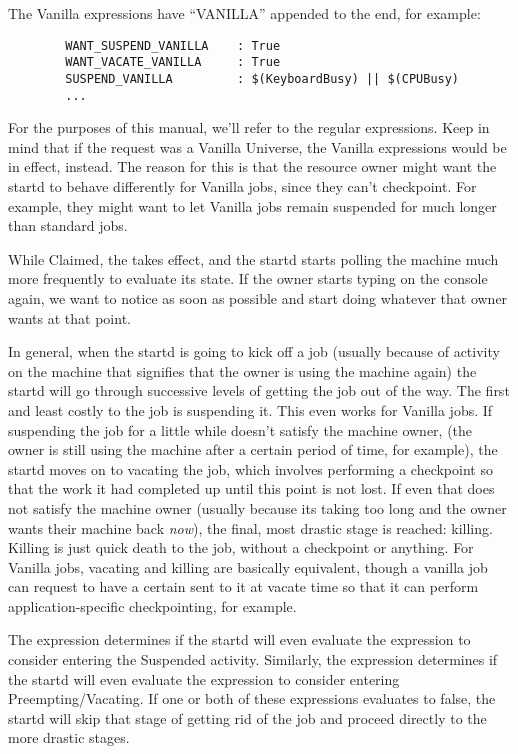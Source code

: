 The Vanilla expressions have ``VANILLA'' appended to the end, for
example:

\begin{verbatim}
        WANT_SUSPEND_VANILLA    : True
        WANT_VACATE_VANILLA     : True
        SUSPEND_VANILLA         : $(KeyboardBusy) || $(CPUBusy)
        ...
\end{verbatim}

For the purposes of this manual, we'll refer to the regular
expressions.  Keep in mind that if the request was a Vanilla Universe,
the Vanilla expressions would be in effect, instead.  The reason for
this is that the resource owner might want the startd to behave
differently for Vanilla jobs, since they can't checkpoint.  For
example, they might want to let Vanilla jobs remain suspended for much
longer than standard jobs.

While Claimed, the  takes effect, and the
startd starts polling the machine much more frequently to evaluate its
state.  If the owner starts typing on the console again, we want to
notice as soon as possible and start doing whatever that owner wants
at that point.  

In general, when the startd is going to kick off a job (usually
because of activity on the machine that signifies that the owner is
using the machine again) the startd will go through successive levels
of getting the job out of the way.  The first and least costly to the
job is suspending it.  This even works for Vanilla jobs.  If
suspending the job for a little while doesn't satisfy the machine
owner, (the owner is still using the machine after a certain period of
time, for example), the startd moves on to vacating the job, which
involves performing a checkpoint so that the work it had completed up
until this point is not lost.  If even that does not satisfy the
machine owner (usually because its taking too long and the owner wants
their machine back \emph{now}), the final, most drastic stage is
reached: killing.  Killing is just quick death to the job, without a
checkpoint or anything.  For Vanilla jobs, vacating and killing are
basically equivalent, though a vanilla job can request to have a
certain  sent to it at vacate time so that it
can perform application-specific checkpointing, for example.

The  expression determines if the startd will even
evaluate the  expression to consider entering the
Suspended activity.  Similarly, the  expression
determines if the startd will even evaluate the 
expression to consider entering Preempting/Vacating.  If one or both
of these expressions evaluates to false, the startd will skip that
stage of getting rid of the job and proceed directly to the more
drastic stages.

